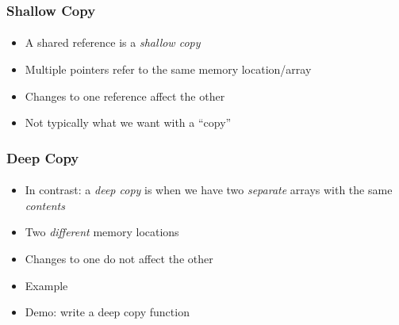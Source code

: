 \documentclass[]{beamer}
\begin{document}
\begin{frame}[fragile]
    \frametitle{Shallow Copy}
    \framesubtitle{}

\begin{itemize}[<+->]
  \item A shared reference is a \emph{shallow copy}
  \item Multiple pointers refer to the same memory location/array
  \item Changes to one reference affect the other
  \item Not typically what we want with a ``copy''
\end{itemize}

\end{frame}

\begin{frame}[fragile]
    \frametitle{Deep Copy}
    \framesubtitle{}

\begin{itemize}[<+->]
  \item In contrast: a \emph{deep copy} is when we have two 
  \emph{separate} arrays with the same \emph{contents}
  \item Two \emph{different} memory locations
  \item Changes to one do not affect the other
  \item Example
  \item Demo: write a deep copy function
\end{itemize}

\end{frame}
\end{document}
